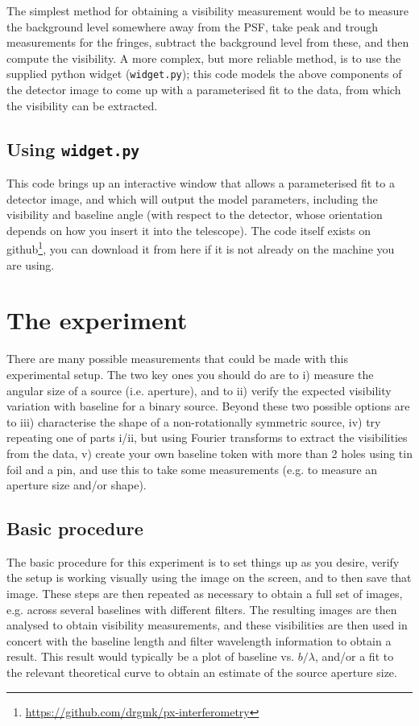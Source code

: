 \documentclass[11pt]{article}
\begin{document}
The simplest method for obtaining a visibility measurement would be to measure the background level somewhere away from the PSF, take peak and trough measurements for the fringes, subtract the background level from these, and then compute the visibility. A more complex, but more reliable method, is to use the supplied python widget (\texttt{widget.py}); this code models the above components of the detector image to come up with a parameterised fit to the data, from which the visibility can be extracted.

\subsection{Using \texttt{widget.py}}\label{sec:widget}

This code brings up an interactive window that allows a parameterised fit to a detector image, and which will output the model parameters, including the visibility and baseline angle (with respect to the detector, whose orientation depends on how you insert it into the telescope). The code itself exists on github\footnote{\href{https://github.com/drgmk/px-interferometry}{https://github.com/drgmk/px-interferometry}}, you can download it from here if it is not already on the machine you are using.

\section{The experiment}

There are many possible measurements that could be made with this experimental setup. The two key ones you should do are to i) measure the angular size of a source (i.e. aperture), and to ii) verify the expected visibility variation with baseline for a binary source. Beyond these two possible options are to iii) characterise the shape of a non-rotationally symmetric source, iv) try repeating one of parts i/ii, but using Fourier transforms to extract the visibilities from the data, v) create your own baseline token with more than 2 holes using tin foil and a pin, and use this to take some measurements (e.g. to measure an aperture size and/or shape).

\subsection{Basic procedure}

The basic procedure for this experiment is to set things up as you desire, verify the setup is working visually using the image on the screen, and to then save that image. These steps are then repeated as necessary to obtain a full set of images, e.g. across several baselines with different filters. The resulting images are then analysed to obtain visibility measurements, and these visibilities are then used in concert with the baseline length and filter wavelength information to obtain a result. This result would typically be a plot of baseline vs. $b/\lambda$, and/or a fit to the relevant theoretical curve to obtain an estimate of the source aperture size.



\end{document}
